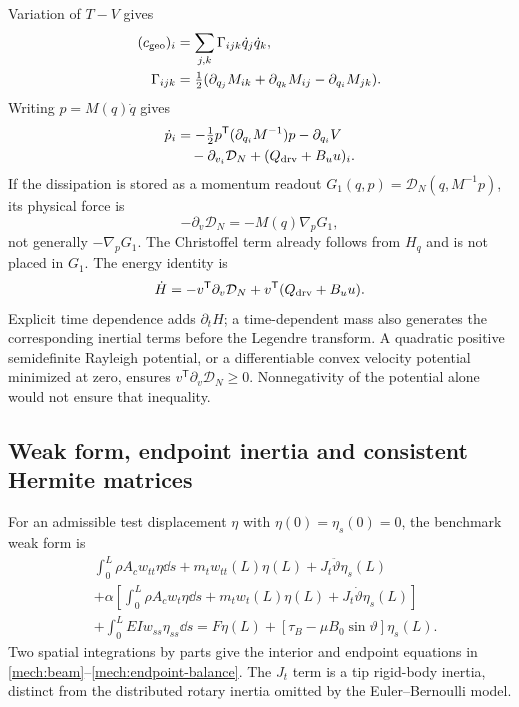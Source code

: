 Variation of $T-V$ gives
\begin{align}
 (c_{\rm geo})_i&=\sum_{j,k}\Gamma_{ijk}\dot q_j\dot q_k,\nonumber\\
 \Gamma_{ijk}&=\tfrac12
   (\partial_{q_j}M_{ik}+\partial_{q_k}M_{ij}
                         -\partial_{q_i}M_{jk}).
 \label{sm:christoffel}
\end{align}
Writing $p=M(q)\dot q$ gives
\begin{align}
 \dot p_i&=-\tfrac12p^{\mathsf T}(\partial_{q_i}M^{-1})p
       -\partial_{q_i}V\nonumber\\
 &\quad-\partial_{v_i}\mathcal D_N+(Q_{\rm drv}+B_u u)_i.
 \label{sm:variable-mass-momentum}
\end{align}
If the dissipation is stored as a momentum readout
$G_1(q,p)=\mathcal D_N(q,M^{-1}p)$, its physical force is
\begin{equation}
 -\partial_v\mathcal D_N=-M(q)\nabla_pG_1,
 \label{sm:rayleigh-momentum}
\end{equation}
not generally $-\nabla_pG_1$. The Christoffel term already follows from
$H_q$ and is not placed in $G_1$.
The energy identity is
\begin{equation}
 \dot H=-v^{\mathsf T}\partial_v\mathcal D_N
              +v^{\mathsf T}(Q_{\rm drv}+B_u u).
 \label{sm:general-power}
\end{equation}
Explicit time dependence adds $\partial_tH$; a time-dependent mass
also generates the corresponding inertial terms before the Legendre
transform. A quadratic positive semidefinite Rayleigh potential, or a
differentiable convex velocity potential minimized at zero, ensures
$v^{\mathsf T}\partial_v\mathcal D_N\ge0$. Nonnegativity of the potential
alone would not ensure that inequality.

\subsection{Weak form, endpoint inertia and consistent Hermite matrices}
\label{sm:weak-form}
For an admissible test displacement $\eta$ with
$\eta(0)=\eta_s(0)=0$, the benchmark weak form is
\begin{align}
 &\int_0^L\!\rho A_c w_{tt}\eta\dd s
       +m_tw_{tt}(L)\eta(L)+J_t\ddot\vartheta\eta_s(L)\nonumber\\
 &+\alpha\left[
       \int_0^L\!\rho A_c w_t\eta\dd s
       +m_tw_t(L)\eta(L)+J_t\dot\vartheta\eta_s(L)\right]\nonumber\\
 &+\int_0^L\!EIw_{ss}\eta_{ss}\dd s
       =F\eta(L)+[\tau_B-\mu B_0\sin\vartheta]\eta_s(L).
 \label{sm:beam-weak}
\end{align}
Two spatial integrations by parts give the interior and endpoint
equations in \eqref{mech:beam}--\eqref{mech:endpoint-balance}.
The $J_t$ term is a tip rigid-body inertia, distinct from the
distributed rotary inertia omitted by the Euler--Bernoulli model.

